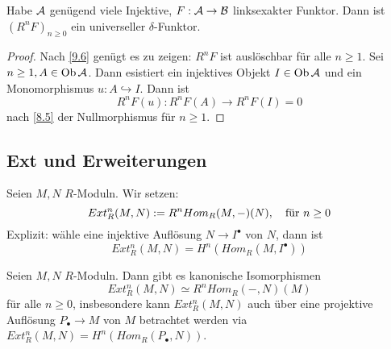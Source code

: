 \begin{fo}\label{9.7}
	Habe $\mathcal{A} $ genügend viele Injektive, $F: \mathcal{A} \to \mathcal{B} $ linksexakter Funktor. Dann ist $(R^{n}F)_{n \geq 0}$ ein universeller $\delta$-Funktor. 
\end{fo}
\begin{proof}
	Nach \ref{9.6} genügt es zu zeigen: $R^{n}F$ ist auslöschbar für alle $ n \geq 1$. Sei $n \geq 1, A \in \text{Ob}\,\mathcal{A} $. Dann esistiert ein injektives Objekt $I \in \text{Ob}\,\mathcal{A}$ und ein Monomorphismus $u: A \hookrightarrow I $. Dann ist
	$$R^{n}F(u): R^{n}F(A) \to R^{n}F(I) = 0 $$nach \ref{8.5} der Nullmorphismus für $n \geq 1$.
\end{proof}
\newpage
\subsection{Ext und Erweiterungen}
\begin{df}
	Seien $M,N$ $R$-Moduln. Wir setzen: $$Ext^{n}_R(M,N)\index{Ext-Funktor} := R^{n}Hom_R(M,-)(N), \quad \text{für }n\geq 0 $$
	Explizit: wähle eine injektive Auflösung $N \to I^{\bullet} $ von $N$, dann ist $$Ext^{n}_R(M,N)=H^{n}(Hom_R(M,I^{\bullet}))$$
\end{df}
\begin{sa}\label{10.2}
	Seien $M,N$ $R$-Moduln. Dann gibt es kanonische Isomorphismen $$Ext^{n}_R(M,N) \simeq R^{n}Hom_R(-,N)(M)$$ für alle $ n \geq 0$, insbesondere kann $Ext^{n}_R(M,N)$ auch über eine projektive Auflösung $P_{\bullet} \to M $ von $M$ betrachtet werden via $Ext^{n}_R(M,N)=H^{n}(Hom_R(P_{\bullet},N))$.
\end{sa}
